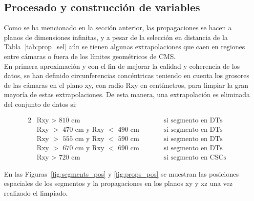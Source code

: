 \subsection{Procesado y construcci\'on de variables}\label{sec:procesado}

Como se ha mencionado en la secci\'on anterior, las propagaciones se hacen a planos de dimensiones infinitas, y a pesar de la selecci\'on en distancia de la Tabla~\ref{tab:prop_sel} a\'un se tienen algunas extrapolaciones que caen en regiones entre c\'amaras o fuera de los l\'imites geom\'etricos de CMS. \\

En primera aproximaci\'on y con el fin de mejorar la calidad y coherencia de los datos, se han definido circunferencias conc\'entricas teniendo en cuenta los grosores de las c\'amaras en el plano xy, con radio Rxy en cent\'imetros, para limpiar la gran mayor\'ia de estas extrapolaciones. De esta manera, una extrapolaci\'on es eliminada del conjunto de datos si:

\begin{alignat*}{2}
& \text{Rxy $>$ 810 cm}                  \quad \quad && \text{si segmento en DTs} \\
& \text{Rxy $>$ 470 cm y Rxy $<$ 490 cm} \quad \quad && \text{si segmento en DTs} \\
& \text{Rxy $>$ 555 cm y Rxy $<$ 590 cm} \quad \quad && \text{si segmento en DTs} \\
& \text{Rxy $>$ 670 cm y Rxy $<$ 690 cm} \quad \quad && \text{si segmento en DTs} \\
& \text{Rxy $>$ 720 cm}                  \quad \quad && \text{si segmento en CSCs}
\end{alignat*}


En las Figuras~\ref{fig:segments_pos} y \ref{fig:props_pos} se muestran las posiciones espaciales de los segmentos y la propagaciones en los planos xy y xz una vez realizado el limpiado. \\


